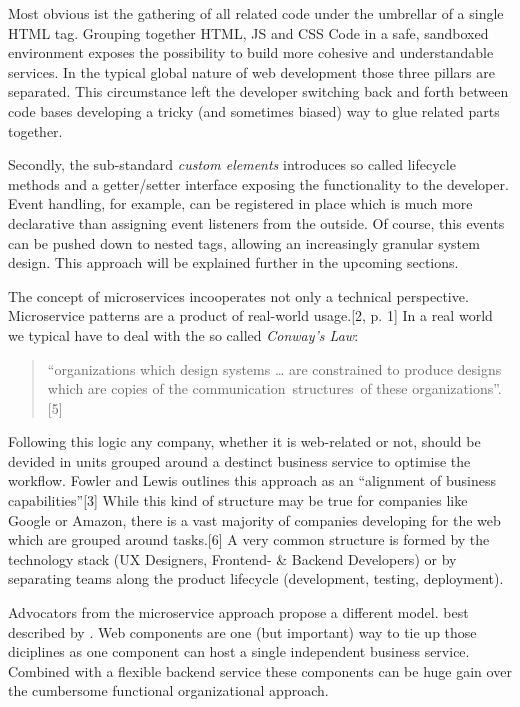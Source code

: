 \documentclass[]{assets/latex/ieee}
\begin{document}
Most obvious ist the gathering of all related code under the umbrellar
of a single HTML tag. Grouping together HTML, JS and CSS Code in a safe,
sandboxed environment exposes the possibility to build more cohesive and
understandable services. In the typical global nature of web development
those three pillars are separated. This circumstance left the developer
switching back and forth between code bases developing a tricky (and
sometimes biased) way to glue related parts together.

Secondly, the sub-standard \emph{custom elements} introduces so called
lifecycle methods and a getter/setter interface exposing the
functionality to the developer. Event handling, for example, can be
registered in place which is much more declarative than assigning event
listeners from the outside. Of course, this events can be pushed down to
nested tags, allowing an increasingly granular system design. This
approach will be explained further in the upcoming sections.

The concept of microservices incooperates not only a technical
perspective. Microservice patterns are a product of real-world
usage.{[}2, p. 1{]} In a real world we typical have to deal with the so
called \emph{Conway's Law}:

\begin{quote}
``organizations which design systems \ldots{} are constrained to produce
designs which are copies of the communication~structures~of these
organizations''. {[}5{]}
\end{quote}

Following this logic any company, whether it is web-related or not,
should be devided in units grouped around a destinct business service to
optimise the workflow. Fowler and Lewis outlines this approach as an
``alignment of business capabilities''{[}3{]} While this kind of
structure may be true for companies like Google or Amazon, there is a
vast majority of companies developing for the web which are grouped
around tasks.{[}6{]} A very common structure is formed by the technology
stack (UX Designers, Frontend- \& Backend Developers) or by separating
teams along the product lifecycle (development, testing, deployment).

Advocators from the microservice approach propose a different model.
best described by . Web components are one (but important) way to tie up
those diciplines as one component can host a single independent business
service. Combined with a flexible backend service these components can
be huge gain over the cumbersome functional organizational approach.
\end{document}
